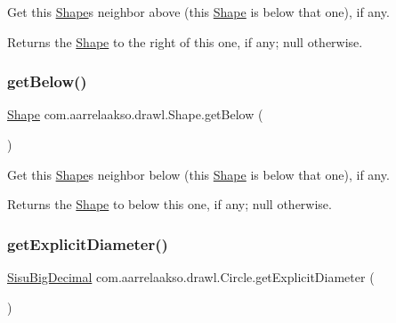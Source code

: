 Get this \hyperlink{classcom_1_1aarrelaakso_1_1drawl_1_1_shape}{Shape}\textquotesingle{}s neighbor above (this \hyperlink{classcom_1_1aarrelaakso_1_1drawl_1_1_shape}{Shape} is below that one), if any.

\begin{DoxyReturn}{Returns}
the \hyperlink{classcom_1_1aarrelaakso_1_1drawl_1_1_shape}{Shape} to the right of this one, if any; {\ttfamily null} otherwise. 
\end{DoxyReturn}
\mbox{\label{classcom_1_1aarrelaakso_1_1drawl_1_1_shape_a53de5ab609d879719cd3b372dfe8df58}} 
\subsubsection{\texorpdfstring{get\+Below()}{getBelow()}}
{\footnotesize\ttfamily \hyperlink{classcom_1_1aarrelaakso_1_1drawl_1_1_shape}{Shape} com.\+aarrelaakso.\+drawl.\+Shape.\+get\+Below (\begin{DoxyParamCaption}{ }\end{DoxyParamCaption})\hspace{0.3cm}{\ttfamily [inherited]}}

Get this \hyperlink{classcom_1_1aarrelaakso_1_1drawl_1_1_shape}{Shape}\textquotesingle{}s neighbor below (this \hyperlink{classcom_1_1aarrelaakso_1_1drawl_1_1_shape}{Shape} is below that one), if any.

\begin{DoxyReturn}{Returns}
the \hyperlink{classcom_1_1aarrelaakso_1_1drawl_1_1_shape}{Shape} to below this one, if any; {\ttfamily null} otherwise. 
\end{DoxyReturn}
\mbox{\label{classcom_1_1aarrelaakso_1_1drawl_1_1_circle_ad4037edaf1ef2bfc989cd157b7f90e61}} 
\subsubsection{\texorpdfstring{get\+Explicit\+Diameter()}{getExplicitDiameter()}}
{\footnotesize\ttfamily \hyperlink{classcom_1_1aarrelaakso_1_1drawl_1_1_sisu_big_decimal}{Sisu\+Big\+Decimal} com.\+aarrelaakso.\+drawl.\+Circle.\+get\+Explicit\+Diameter (\begin{DoxyParamCaption}{ }\end{DoxyParamCaption})\hspace{0.3cm}{\ttfamily [private]}}

